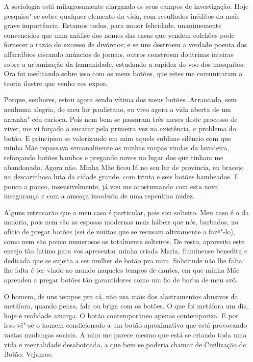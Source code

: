 A sociologia está milagrosamente alargando os seus campos de
investigação. Hoje pesquisa"-se sobre qualquer elemento da vida, com
resultados inéditos da mais grave importância. Estamos todos, para maior
felicidade, unanimemente convencidos que uma análise dos nomes das casas
que vendem colchões pode fornecer a razão do excesso de divórcios; e se
uns destroem a verdade poenta dos alfarrábios ciscando anúncios de
jornais, outros constroem doutrinas inteiras sobre a urbanização da
humanidade, estudando a rapidez do voo dos mosquitos. Ora foi meditando
sobre isso com os meus botões, que estes me comunicaram a teoria ilustre
que venho vos expor.

Porque, senhores, estou agora sendo vítima dos meus botões. Arrancado,
sem nenhuma alegria, do meu lar paulistano, eu vivo agora a vida aberta
de um arranha"-céu carioca. Pois nem bem se passaram três meses deste
processo de viver, me vi forçado a encarar pela primeira vez na
existência, o problema do botão. E principiou se valorizando em mim
aquele sublime silêncio com que minha Mãe repassava semanalmente as
minhas roupas vindas da lavadeira, reforçando botões bambos e pregando
novos no lugar dos que tinham me abandonado. Agora não. Minha Mãe ficou
lá no seu lar de província, eu bracejo na descarinhosa luta da cidade
grande, com trinta e seis botões bambeados. E pouco a pouco,
insensivelmente, já vou me acostumando com esta nova insegurança e com a
ameaça imodesta de uma repentina nudez.

Alguns retrucarão que o meu caso é particular, pois sou solteiro. Meu
caso é o da maioria, pois nem são as esposas modernas mais hábeis que
nós, barbados, no ofício de pregar botões (sei de muitas que se recusam
altivamente a fazê"-lo), como nem são pouco numerosos os totalmente
solteiros. De resto, aproveito este ensejo tão íntimo para vos
apresentar minha criada Maria, fluminense benedita e dedicada que se
sujeita a ser mulher de botão pra mim. Solicitude não lhe falta: lhe
falta é ter vindo ao mundo naqueles tempos de dantes, em que minha Mãe
aprendeu a pregar botões tão garantidores como um fio de barba de meu
avô.

O homem, de uns tempos pra cá, não usa mais dos alastramentos abusivos
da metáfora, quando pensa, fala ou briga com os botões. O que foi
metáfora um dia, hoje é realidade amarga. O botão contemporâneo apenas
contemporiza. E por isso vê"-se o homem condicionado a um botão
aproximativo que está provocando vastas mudanças sociais. A mim me
parece mesmo que está se criando toda uma vida e mentalidade
desabotoada, a que bem se poderia chamar de Civilização do Botão.
Vejamos:

